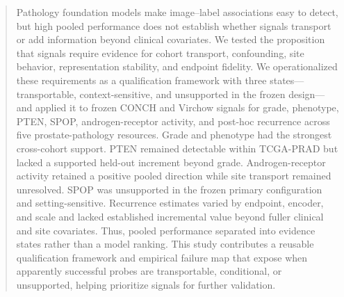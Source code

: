 \begin{abstract}
Pathology foundation models make image--label associations easy to detect, but high pooled
performance does not establish whether signals transport or add information beyond
clinical covariates. We tested the proposition that signals require evidence for cohort
transport, confounding, site behavior,
representation stability, and endpoint fidelity. We operationalized these requirements as
a qualification framework with three states---transportable, context-sensitive, and
unsupported in the frozen design---and applied it to frozen CONCH and Virchow signals for
grade, phenotype, PTEN, SPOP, androgen-receptor activity, and post-hoc recurrence across
five prostate-pathology resources. Grade and phenotype had the strongest cross-cohort
support. PTEN remained detectable within TCGA-PRAD but lacked a supported held-out
increment beyond grade. Androgen-receptor activity retained a positive pooled direction
while site transport remained unresolved. SPOP was unsupported in the frozen primary
configuration and setting-sensitive. Recurrence estimates varied by endpoint, encoder,
and scale and lacked established incremental value beyond fuller clinical and site
covariates. Thus, pooled performance separated into evidence states rather than a model
ranking. This study contributes a reusable qualification framework and empirical failure
map that expose when apparently successful probes are transportable, conditional, or
unsupported, helping prioritize signals for further validation.
\end{abstract}
